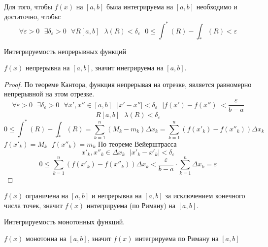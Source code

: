 \begin{theorem}
  Для того, чтобы $f(x)$ на $[a,b]$ была интегрируема на $[a,b]$ необходимо
  и достаточно, чтобы:
  \[
    \forall \varepsilon > 0 ~~~ \exists \delta_\varepsilon > 0 ~~~ \forall R
    [a,b] ~~~ \lambda (R) < \delta_\varepsilon ~~~ 0 \le \int^* (R) -
    \int_* (R) < \varepsilon
  \]
\end{theorem}

\begin{title}[\Large]
  Интегрируемость непрерывных функций
\end{title}

\begin{theorem}
  $f(x)$ непрерывна на $[a,b]$, значит инегрируема на $[a,b]$.
\end{theorem}

\begin{proof}
  По теореме Кантора, функция непрерывая на отрезке, является равномерно
  непрерывной на этом отрезке.
  \[
    \forall \varepsilon > 0 ~~~ \exists \delta_\varepsilon > 0 ~~~ \forall
    x', x'' \in [a,b] ~~~ |x' - x''| < \delta_\varepsilon ~~~
    |f(x') - f(x'')| < \frac{\varepsilon}{b - a}
  \]
  \[R [a,b] ~~~ \lambda (R) < \delta_\varepsilon\]
  \[
    0 \le \int^* (R) - \int_* (R) = \sum_{k = 1}^{n} (M_k - m_k)
    \Delta x_k = \sum_{k = 1}^{n} (f(x'_k) - f(x''_k)) \Delta x_k
  \]
  $f(x'_k) = M_k ~~~ f(x''_k) = m_k$
  По теореме Вейерштрасса
  \[x'_k, x''_k \in \Delta x_k ~~~ |x'_k - x'_k| < \delta_\varepsilon\]
  \[
    0 \le \sum_{k = 1}^{n} (f(x'_k) - f(x''_k)) \Delta x_k <
    \frac{\varepsilon}{b - a} \cdot \sum_{k = 1}^{n} \Delta x_k = \varepsilon
  \]
\end{proof}

\begin{theorem}
  $f(x)$ ограничена на $[a,b]$ и непрерывна на $[a,b]$ за исключением конечного
  числа точек, значит $f(x)$ интегрируема (по Риману) на $[a,b]$.
\end{theorem}

\begin{title}[\Large]
  Интегрируемость монотонных функций.
\end{title}

\begin{theorem}
  $f(x)$ монотонна на $[a,b]$, значит $f(x)$ интегрируема по Риману на $[a,b]$
\end{theorem}

